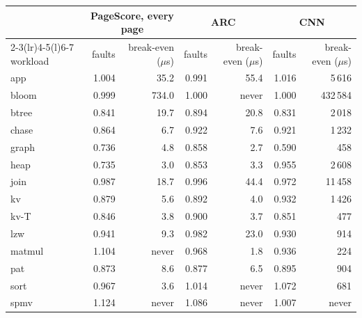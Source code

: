 \begin{tabular}{lrrrrrr}
\toprule
 & \multicolumn{2}{c}{PageScore, every page} & \multicolumn{2}{c}{ARC} & \multicolumn{2}{c}{CNN} \\
\cmidrule(lr){2-3}\cmidrule(lr){4-5}\cmidrule(l){6-7}
workload & faults & break-even ($\mu$s) & faults & break-even ($\mu$s) & faults & break-even ($\mu$s) \\
\midrule
app & 1.004 & 35.2 & 0.991 & 55.4 & 1.016 & 5\,616 \\
bloom & 0.999 & 734.0 & 1.000 & never & 1.000 & 432\,584 \\
btree & 0.841 & 19.7 & 0.894 & 20.8 & 0.831 & 2\,018 \\
chase & 0.864 & 6.7 & 0.922 & 7.6 & 0.921 & 1\,232 \\
graph & 0.736 & 4.8 & 0.858 & 2.7 & 0.590 & 458 \\
heap & 0.735 & 3.0 & 0.853 & 3.3 & 0.955 & 2\,608 \\
join & 0.987 & 18.7 & 0.996 & 44.4 & 0.972 & 11\,458 \\
kv & 0.879 & 5.6 & 0.892 & 4.0 & 0.932 & 1\,426 \\
kv-T & 0.846 & 3.8 & 0.900 & 3.7 & 0.851 & 477 \\
lzw & 0.941 & 9.3 & 0.982 & 23.0 & 0.930 & 914 \\
matmul & 1.104 & never & 0.968 & 1.8 & 0.936 & 224 \\
pat & 0.873 & 8.6 & 0.877 & 6.5 & 0.895 & 904 \\
sort & 0.967 & 3.6 & 1.014 & never & 1.072 & 681 \\
spmv & 1.124 & never & 1.086 & never & 1.007 & never \\
\bottomrule
\end{tabular}

